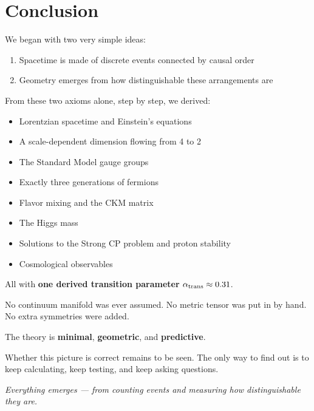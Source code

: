 \documentclass[11pt, a4paper, openany]{book}
\begin{document}

\chapter{Conclusion}

We began with two very simple ideas:

\begin{enumerate}
  \item Spacetime is made of discrete events connected by causal order
  \item Geometry emerges from how distinguishable these arrangements are
\end{enumerate}

From these two axioms alone, step by step, we derived:

\begin{itemize}
  \item Lorentzian spacetime and Einstein's equations
  \item A scale-dependent dimension flowing from 4 to 2
  \item The Standard Model gauge groups
  \item Exactly three generations of fermions
  \item Flavor mixing and the CKM matrix
  \item The Higgs mass
  \item Solutions to the Strong CP problem and proton stability
  \item Cosmological observables
\end{itemize}

All with \textbf{one derived transition parameter} $\alpha_{\rm trans} \approx 0.31$.

No continuum manifold was ever assumed.
No metric tensor was put in by hand.
No extra symmetries were added.

The theory is \textbf{minimal}, \textbf{geometric}, and \textbf{predictive}.

Whether this picture is correct remains to be seen.
The only way to find out is to keep calculating, keep testing, and keep asking questions.

\begin{center}
\textit{Everything emerges --- from counting events and measuring how distinguishable they are.}
\end{center}
\end{document}
